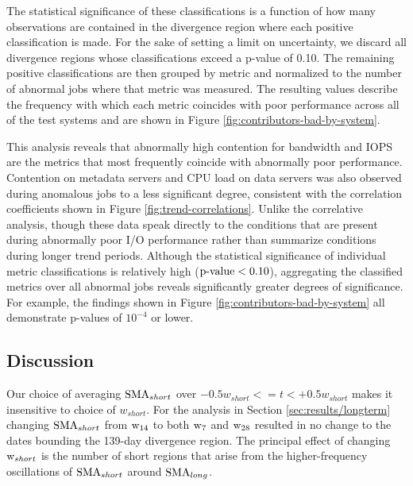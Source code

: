 The statistical significance of these classifications is a function of how many observations are contained in the divergence region where each positive classification is made.
For the sake of setting a limit on uncertainty, we discard all divergence regions whose classifications exceed a p-value of 0.10. 
The remaining positive classifications are then grouped by metric and normalized to the number of abnormal jobs where that metric was measured.
The resulting values describe the frequency with which each metric coincides with poor performance across all of the test systems and are shown in Figure \ref{fig:contributors-bad-by-system}.

This analysis reveals that abnormally high contention for bandwidth and IOPS are the metrics that most frequently coincide with abnormally poor performance.
Contention on metadata servers and CPU load on data servers was also observed during anomalous jobs to a less significant degree, consistent with the correlation coefficients shown in Figure \ref{fig:trend-correlations}.
Unlike the correlative analysis, though these data speak directly to the conditions that are present during abnormally poor I/O performance rather than summarize conditions during longer trend periods.
Although the statistical significance of individual metric classifications is relatively high (${\textup{p-value} < 0.10}$), aggregating the classified metrics over all abnormal jobs reveals significantly greater degrees of significance.
For example, the findings shown in Figure \ref{fig:contributors-bad-by-system} all demonstrate p-values of $10^{-4}$ or lower.





\subsection {Discussion}
\label{sec:results/discussion}


Our choice of averaging $\textup{SMA}_{short}$ over ${-0.5w_{short} <= t < +0.5w_{short}}$ makes it insensitive to choice of $w_{short}$.
For the analysis in Section \ref{sec:results/longterm} changing $\textup{SMA}_{short}$ from $\textup{w}_{14}$ to both $\textup{w}_{7}$ and $\textup{w}_{28}$ resulted in no change to the dates bounding the 139-day divergence region.
The principal effect of changing $\textup{w}_{short}$ is the number of short regions that arise from the higher-frequency oscillations of $\textup{SMA}_{short}$ around $\textup{SMA}_{long}$.

